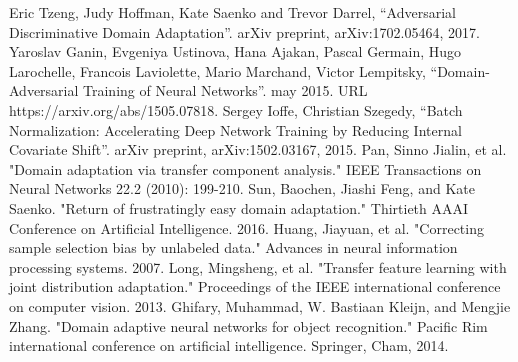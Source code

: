 \documentclass[conference]{IEEEtran}
\begin{document}

\begin{thebibliography}{99}
 Eric Tzeng, Judy Hoffman, Kate Saenko and Trevor Darrel, ``Adversarial Discriminative Domain Adaptation''. arXiv preprint, arXiv:1702.05464, 2017.
 Yaroslav Ganin, Evgeniya Ustinova, Hana Ajakan, Pascal Germain, Hugo Larochelle, Francois Laviolette,
    Mario Marchand, Victor Lempitsky, ``Domain-Adversarial Training of Neural Networks''. may 2015. URL https://arxiv.org/abs/1505.07818.
 Sergey Ioffe, Christian Szegedy, ``Batch Normalization: Accelerating Deep Network Training by Reducing Internal Covariate Shift''.  arXiv preprint, arXiv:1502.03167, 2015.
 Pan, Sinno Jialin, et al. "Domain adaptation via transfer component analysis." IEEE Transactions on Neural Networks 22.2 (2010): 199-210.
 Sun, Baochen, Jiashi Feng, and Kate Saenko. "Return of frustratingly easy domain adaptation." Thirtieth AAAI Conference on Artificial Intelligence. 2016.
 Huang, Jiayuan, et al. "Correcting sample selection bias by unlabeled data." Advances in neural information processing systems. 2007.
 Long, Mingsheng, et al. "Transfer feature learning with joint distribution adaptation." Proceedings of the IEEE international conference on computer vision. 2013.
 Ghifary, Muhammad, W. Bastiaan Kleijn, and Mengjie Zhang. "Domain adaptive neural networks for object recognition." Pacific Rim international conference on artificial intelligence. Springer, Cham, 2014.
\end{thebibliography}
\end{document}
